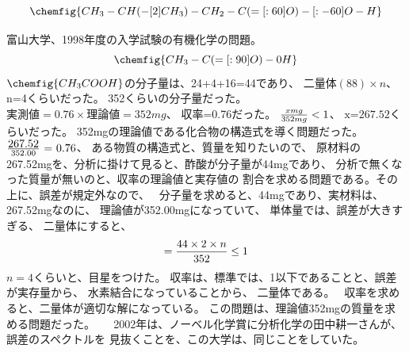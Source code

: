 \documentclass{jsarticle}
\begin{document}
\title{}
\author{}
\date{}
\maketitle
 $$  \chemfig{CH_3-CH(-[2]CH_3)-CH_2-C(=[:60]O)-[:-60]O-H} $$ 

 富山大学、1998年度の入学試験の有機化学の問題。
	$$ \chemfig{CH_3-C(=[:90]O)-0H} $$
	$\chemfig{CH_3 COOH}$の分子量は、24+4+16=44であり、
	$\text{$二量体(88)\times n$}$、 n=4くらいだった。
	352くらいの分子量だった。
	$\text{$実測値=0.76\times 理論値=352mg$}$、
	収率=0.76だった。
	$\text{${xmg \over 352mg} < 1$}$、
	$\text{x=267.52}$くらいだった。
	352mgの理論値である化合物の構造式を導く問題だった。
	$\text{{$267.52 \over 352.00$} = 0.76}$、
	ある物質の構造式と、質量を知りたいので、
	原材料の267.52mgを、分析に掛けて見ると、酢酸が分子量が44mgであり、
	分析で無くなった質量が無いのと、収率の理論値と実存値の
	割合を求める問題である。その上に、誤差が規定外なので、　
	分子量を求めると、44mgであり、実材料は、267.52mgなのに、
	理論値が352.00mgになっていて、
	単体量では、誤差が大きすぎる、
	二量体にすると、
	$$ = {{44 \times 2 \times n} \over {352}} \le 1 $$
	$n = 4$くらいと、目星をつけた。
        収率は、標準では、1以下であることと、誤差が実存量から、
	水素結合になっていることから、
	二量体である。　
	収率を求めると、二量体が適切な解になっている。
	この問題は、理論値352mgの質量を求める問題だった。
	　
  2002年は、ノーベル化学賞に分析化学の田中耕一さんが、誤差のスペクトルを
	見抜くことを、この大学は、同じことをしていた。
\end{document}
